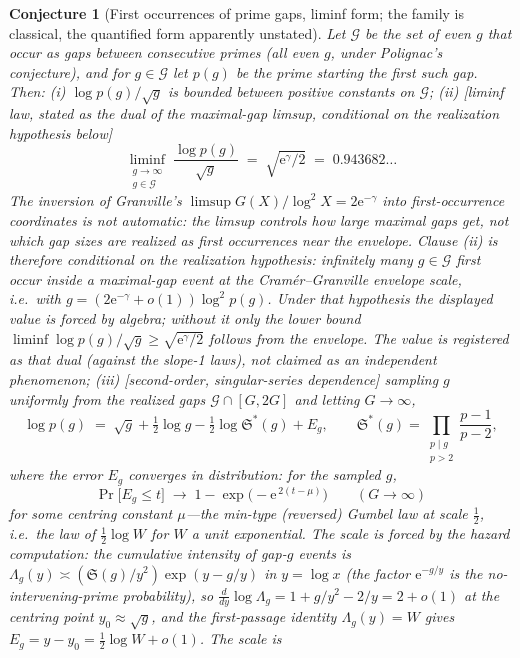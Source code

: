 \documentclass[11pt]{article}
\newtheorem{conjecture}{Conjecture}
\theoremstyle{definition}
\newcommand{\e}{\mathrm{e}}
\newcommand{\SG}{\mathfrak S}
\begin{document}
\setcounter{conjecture}{10}%
\begin{conjecture}[First occurrences of prime gaps, liminf form; the
family is classical, the quantified form apparently
unstated]\label{c19}
Let $\mathcal G$ be the set of even $g$ that occur as gaps between
consecutive primes (all even $g$, under Polignac's conjecture), and for
$g\in\mathcal G$ let $p(g)$ be the prime starting the first such gap.
Then:
\emph{(i)} $\log p(g)/\sqrt g$ is bounded between positive constants
on $\mathcal G$;
\emph{(ii)} [liminf law, stated as the dual of the maximal-gap
limsup, \emph{conditional on the realization hypothesis below}]
\[
\liminf_{\substack{g\to\infty\\ g\in\mathcal G}}
\ \frac{\log p(g)}{\sqrt g}
\;=\;\sqrt{\e^{\gamma}/2}\;=\;0.943682\ldots
\]
The inversion of Granville's $\limsup G(X)/\log^2X=2\e^{-\gamma}$
into first-occurrence coordinates is \emph{not} automatic: the limsup
controls how large maximal gaps get,
not which gap \emph{sizes} are realized as first occurrences near the
envelope.  Clause (ii) is therefore conditional on the
\emph{realization hypothesis}: infinitely many $g\in\mathcal G$ first
occur inside a maximal-gap event at the Cram\'er--Granville envelope
scale, i.e.\ with $g=(2\e^{-\gamma}+o(1))\log^2 p(g)$.  Under that
hypothesis the displayed value is forced by algebra; without it only
the lower bound
$\liminf\log p(g)/\sqrt g\ge\sqrt{\e^{\gamma}/2}$ follows from the
envelope.  The value is registered \emph{as} that dual (against the
slope-1 laws), not claimed as an independent phenomenon;
\emph{(iii)} [second-order, singular-series dependence] sampling $g$
uniformly from the realized gaps $\mathcal G\cap[G,2G]$ and letting
$G\to\infty$,
\[
\log p(g)\;=\;\sqrt g+\tfrac12\log g-\tfrac12\log\SG^{*}(g)+E_g,
\qquad
\SG^{*}(g)=\prod_{\substack{p\mid g\\ p>2}}\frac{p-1}{p-2},
\]
where the error $E_g$ converges in distribution: for the sampled $g$,
\[
\Pr\bigl[E_g\le t\bigr]\;\longrightarrow\;
1-\exp\bigl(-\e^{\,2(t-\mu)}\bigr)
\qquad(G\to\infty)
\]
for some centring constant $\mu$---the min-type (reversed) Gumbel
law \emph{at scale} $\tfrac12$, i.e.\ the law of $\tfrac12\log W$
for $W$ a unit exponential.  The scale is forced by the hazard computation:
the cumulative intensity of
gap-$g$ events is $\Lambda_g(y)\asymp(\SG(g)/y^2)\exp(y-g/y)$ in
$y=\log x$ (the factor $\e^{-g/y}$ \emph{is} the no-intervening-prime
probability), so
$\frac{d}{dy}\log\Lambda_g=1+g/y^2-2/y=2+o(1)$ at the centring
point $y_0\approx\sqrt g$, and the first-passage identity
$\Lambda_g(y)=W$ gives $E_g=y-y_0=\tfrac12\log W+o(1)$.  The scale is

\end{conjecture}
\end{document}
